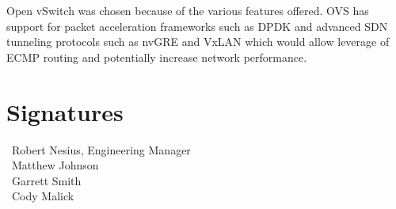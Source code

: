 \documentclass[10pt,onecolumn,journal,draftclsnofoot]{IEEEtran}
\begin{document}
Open vSwitch was chosen because of the various features offered. OVS has support
for packet acceleration frameworks such as DPDK and advanced SDN tunneling
protocols such as nvGRE and VxLAN which would allow leverage of ECMP routing and
potentially increase network performance.

\clearpage
\section{Signatures}
\vspace{2cm}
\begin{flushleft}
	\noindent\hspace{0.7cm}\makebox[1.5in]{\hrulefill}~Robert Nesius, Engineering Manager\\
	\vspace{1cm}
	\hspace{0.7cm}\makebox[1.5in]{\hrulefill}~Matthew Johnson\\
	\vspace{1cm}
	\hspace{0.7cm}\makebox[1.5in]{\hrulefill}~Garrett Smith\\
	\vspace{1cm}
	\hspace{0.7cm}\makebox[1.5in]{\hrulefill}~Cody Malick
\end{flushleft}
\end{document}
